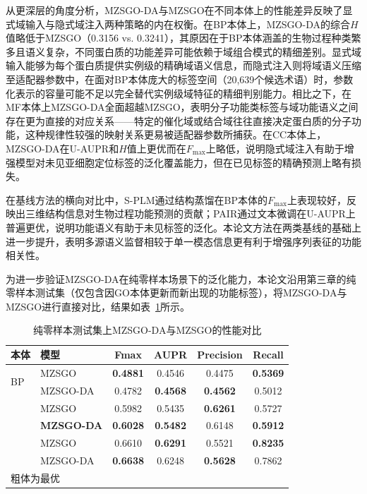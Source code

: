 从更深层的角度分析，MZSGO-DA与MZSGO在不同本体上的性能差异反映了显式域输入与隐式域注入两种策略的内在权衡。在BP本体上，MZSGO-DA的综合$H$值略低于MZSGO（0.3156 vs. 0.3241），其原因在于BP本体涵盖的生物过程种类繁多且语义复杂，不同蛋白质的功能差异可能依赖于域组合模式的精细差别。显式域输入能够为每个蛋白质提供实例级的精确域语义信息，而隐式注入则将域语义压缩至适配器参数中，在面对BP本体庞大的标签空间（20,639个候选术语）时，参数化表示的容量可能不足以完全替代实例级域特征的精细判别能力。相比之下，在MF本体上MZSGO-DA全面超越MZSGO，表明分子功能类标签与域功能语义之间存在更为直接的对应关系——特定的催化域或结合域往往直接决定蛋白质的分子功能，这种规律性较强的映射关系更易被适配器参数所捕获。在CC本体上，MZSGO-DA在U-AUPR和$H$值上更优而在$F_{\max}$上略低，说明隐式域注入有助于增强模型对未见亚细胞定位标签的泛化覆盖能力，但在已见标签的精确预测上略有损失。

在基线方法的横向对比中，S-PLM通过结构蒸馏在BP本体的$F_{\max}$上表现较好，反映出三维结构信息对生物过程功能预测的贡献；PAIR通过文本微调在U-AUPR上普遍更优，说明功能语义有助于未见标签的泛化。本论文方法在两类基线的基础上进一步提升，表明多源语义监督相较于单一模态信息更有利于增强序列表征的功能相关性。

为进一步验证MZSGO-DA在纯零样本场景下的泛化能力，本论文沿用第三章的纯零样本测试集（仅包含因GO本体更新而新出现的功能标签），将MZSGO-DA与MZSGO进行直接对比，结果如表~\ref{tab:mzsgo_da_zeroshot}所示。

\begin{table}[htbp]
\centering
\caption{纯零样本测试集上MZSGO-DA与MZSGO的性能对比}
\label{tab:mzsgo_da_zeroshot}
\small
\begin{tabular}{llcccc}
\toprule
\textbf{本体} & \textbf{模型} & \textbf{Fmax} & \textbf{AUPR} & \textbf{Precision} & \textbf{Recall} \\
\midrule
\multirow{2}{*}{BP}
 & MZSGO & \textbf{0.4881} & 0.4546 & 0.4475 & \textbf{0.5369} \\
 & MZSGO-DA & 0.4782 & \textbf{0.4568} & \textbf{0.4562} & 0.5012 \\
\addlinespace[5pt]
\multirow{2}{*}{MF}
 & MZSGO & 0.5982 & 0.5435 & \textbf{0.6261} & 0.5727 \\
 & \textbf{MZSGO-DA} & \textbf{0.6028} & \textbf{0.5482} & 0.6148 & \textbf{0.5912} \\
\addlinespace[5pt]
\multirow{2}{*}{CC}
 & MZSGO & 0.6610 & \textbf{0.6291} & 0.5521 & \textbf{0.8235} \\
 & MZSGO-DA & \textbf{0.6638} & 0.6248 & \textbf{0.5628} & 0.7862 \\
\bottomrule
\multicolumn{6}{l}{\vspace{0.2em}\footnotesize 粗体为最优} \\
\end{tabular}
\end{table}

